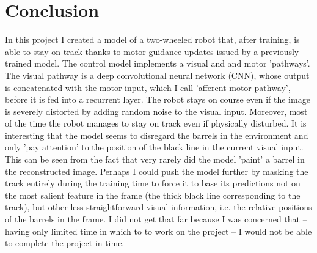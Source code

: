 \documentclass[11pt, oneside]{article}   	%
\begin{document}
\section{Conclusion}
In this project I created a model of a two-wheeled robot that, after training, is able to stay on track thanks to motor guidance updates issued by a previously trained model. The control model implements a visual and and motor 'pathways'. The visual pathway is a deep convolutional neural network (CNN), whose output is concatenated with the motor input, which I call 'afferent motor pathway', before it is fed into a recurrent layer. The robot stays on course even if the image is severely distorted by adding random noise to the visual input. Moreover, most of the time the robot manages to stay on track even if physically disturbed. It is interesting that the model seems to disregard the barrels in the environment and only 'pay attention' to the position of the black line in the current visual input. This can be seen from the fact that very rarely did the model 'paint' a barrel in the reconstructed image. Perhaps I could push the model further by masking the track entirely during the training time to force it to base its predictions not on the most salient feature in the frame (the thick black line corresponding to the track), but other less straightforward visual information, i.e. the relative positions of the barrels in the frame. I did not get that far because I was concerned that -- having only limited time in which to to work on the project -- I would not be able to complete the project in time.



\end{document}
